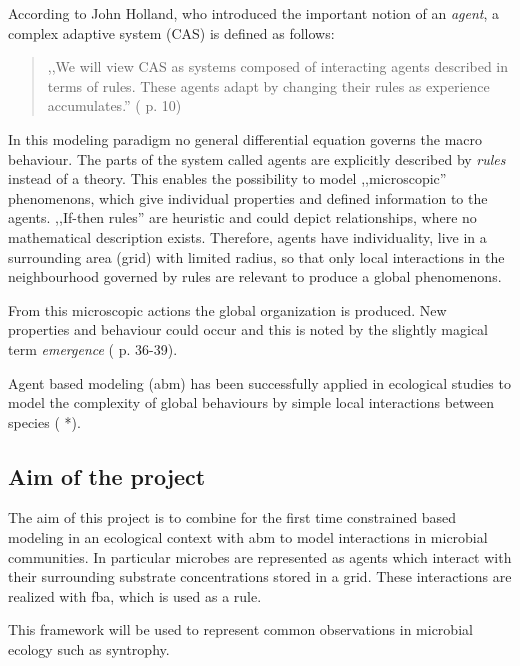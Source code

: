 According to John Holland, who introduced the important notion of an \textit{agent}, a complex adaptive system (CAS) is defined as follows:
\begin{quote}
,,We will view CAS as systems composed of interacting agents described in terms of rules. These agents adapt by changing their rules as experience accumulates.'' (\cite{Holland1995} p. 10)
\end{quote}
In this modeling paradigm no general differential equation governs the macro behaviour.
The parts of the system called agents are explicitly described by \textit{rules} instead of a theory.
This enables the possibility to model ,,microscopic'' phenomenons, which give individual properties and defined information to the agents.
,,If-then rules'' are heuristic and could depict relationships, where no mathematical description exists.
Therefore, agents have individuality, live in a surrounding area (grid) with limited radius, so that only local interactions in the neighbourhood governed by rules are relevant to produce a global phenomenons.

From this microscopic actions the global organization is produced.
New properties and behaviour could occur and this is noted by the slightly magical term \textit{emergence} (\cite{Zimmermann2010} p. 36-39).

Agent based modeling (abm) has been successfully applied in ecological studies to model the complexity of global behaviours by simple local interactions between species ( *).

\subsection{Aim of the project}
The aim of this project is to combine for the first time constrained based modeling in an ecological context with abm to model interactions in microbial communities. In particular microbes are represented as agents which interact with their surrounding substrate concentrations stored in a grid. These interactions are realized with fba, which is used as a rule.

This framework will be used to represent common observations in microbial ecology such as syntrophy.
